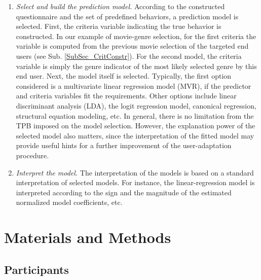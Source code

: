 \documentclass{llncs}
\begin{document}
\begin{enumerate}
 \item {\it Select and build the prediction model.} According to the constructed questionnaire and the set of predefined behaviors, a prediction model is selected. First, the criteria variable indicating the true behavior is constructed. In our example of movie-genre selection, for the first criteria the variable is computed from the previous movie selection of the targeted end users (see Sub. \ref{SubSec_CritConstr}). For the second model, the criteria variable is simply the genre indicator of the most likely selected genre by this end user. Next, the model itself is selected. Typically, the first option considered is a multivariate linear regression model (MVR), if the predictor and criteria variables fit the requirements. Other options include linear discriminant analysis (LDA), the logit regression model, canonical regression, structural equation modeling, etc. In general, there is no limitation from the TPB imposed on the model selection. %
However, the explanation power of the selected model also matters, since the interpretation of the fitted model may provide useful hints for a further improvement of the user-adaptation procedure. 
 \item {\it Interpret the model.} The interpretation of the models is based on a standard interpretation of selected models. For instance, the linear-regression model is interpreted according to the sign and the magnitude of the estimated normalized model coefficients, etc. 
\end{enumerate}


\section{Materials and Methods}\label{Sec_MatAndMeths}  

\subsection{Participants}\label{SubSec_Participants}
\end{document}
